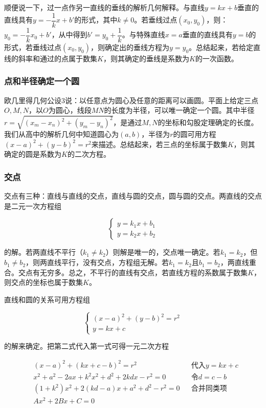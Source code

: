\documentclass[b5paper]{ctexart}
\begin{document}
顺便说一下，过一点作另一直线的垂线的解析几何解释。与直线$y = kx + b$垂直的直线具有$y = -\dfrac{1}{k} x + b'$的形式，其中$k \ne 0$。若垂线过点$(x_0, y_0)$，则：$y_0 = -\dfrac{1}{k} x_0 + b'$，从中得到$b' = y_0 + \dfrac{1}{k}$。与特殊直线$x = a$垂直的直线具有$y = b$的形式，若垂线过点$(x_0, y_0)$，则确定出的垂线方程为$y = y_0$。总结起来，若给定直线的斜率和通过的点属于数集$K$，则其确定的垂线是系数为$K$的一次函数。

\subsubsection{点和半径确定一个圆}

欧几里得几何公设3说：以任意点为圆心及任意的距离可以画圆。平面上给定三点$O, M, N$，以$O$为圆心，线段$MN$的长度为半径，可以唯一确定一个圆。其中半径$r = \sqrt{(x_m - x_n)^2 + (y_m - y_n)^2}$，是通过$M, N$的坐标和勾股定理确定的长度。我们从高中的解析几何中知道圆心为$(a, b)$，半径为$r$的圆可用方程$(x - a)^2 + (y - b)^2 = r^2$来描述。总结起来，若三点的坐标属于数集$K$，则其确定的圆是系数为$K$的二次方程。

\subsubsection{交点}
交点有三种：直线与直线的交点，直线与圆的交点，圆与圆的交点。两直线的交点是二元一次方程组

\[
\begin{cases}
y = k_1 x + b_1 \\
y = k_2 x + b_2
\end{cases}
\]

的解。若两直线不平行（$k_1 \ne k_2$）则解是唯一的，交点唯一确定。若$k_1 = k_2$，但$b_1 \ne b_2$，则两直线平行，没有交点，方程组无解。若$k_1 = k_2$且$b_1 = b_2$，两直线重合。交点有无穷多。总之，不平行的直线有交点，若直线方程的系数属于数集$K$，则交点的坐标也属于数集$K$。

直线和圆的关系可用方程组

\[
\begin{cases}
(x - a)^2 + (y - b)^2 = r^2 \\
y = kx + c
\end{cases}
\]

的解来确定。把第二式代入第一式可得一元二次方程

\begin{align*}
& (x - a)^2 + (kx + c - b)^2 = r^2  &&\text{代入}y = kx + c \\
& x^2 + a^2 - 2ax + k^2x^2 + d^2 + 2kdx - r^2 =0 && \text{令}d = c - b \\
& (1 + k^2)x^2 + 2(kd - a)x + a^2 + d^2 - r^2 = 0 && \text{合并同类项} \\
& Ax^2 + 2Bx + C = 0
\end{align*}
\end{document}

